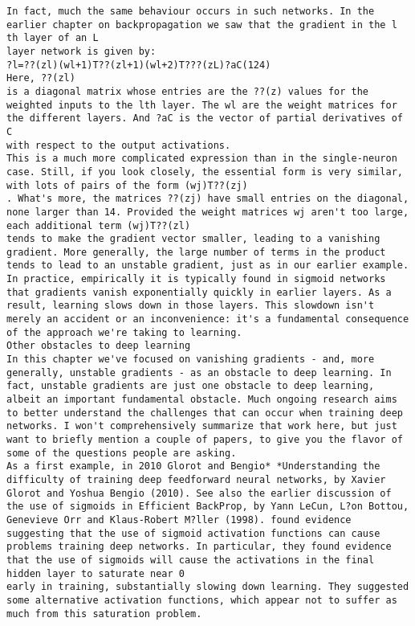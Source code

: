 \begin{lstlisting}
In fact, much the same behaviour occurs in such networks. In the earlier chapter on backpropagation we saw that the gradient in the l
th layer of an L
layer network is given by:
?l=??(zl)(wl+1)T??(zl+1)(wl+2)T???(zL)?aC(124)
Here, ??(zl)
is a diagonal matrix whose entries are the ??(z) values for the weighted inputs to the lth layer. The wl are the weight matrices for the different layers. And ?aC is the vector of partial derivatives of C
with respect to the output activations.
This is a much more complicated expression than in the single-neuron case. Still, if you look closely, the essential form is very similar, with lots of pairs of the form (wj)T??(zj)
. What's more, the matrices ??(zj) have small entries on the diagonal, none larger than 14. Provided the weight matrices wj aren't too large, each additional term (wj)T??(zl)
tends to make the gradient vector smaller, leading to a vanishing gradient. More generally, the large number of terms in the product tends to lead to an unstable gradient, just as in our earlier example. In practice, empirically it is typically found in sigmoid networks that gradients vanish exponentially quickly in earlier layers. As a result, learning slows down in those layers. This slowdown isn't merely an accident or an inconvenience: it's a fundamental consequence of the approach we're taking to learning.
Other obstacles to deep learning
In this chapter we've focused on vanishing gradients - and, more generally, unstable gradients - as an obstacle to deep learning. In fact, unstable gradients are just one obstacle to deep learning, albeit an important fundamental obstacle. Much ongoing research aims to better understand the challenges that can occur when training deep networks. I won't comprehensively summarize that work here, but just want to briefly mention a couple of papers, to give you the flavor of some of the questions people are asking.
As a first example, in 2010 Glorot and Bengio* *Understanding the difficulty of training deep feedforward neural networks, by Xavier Glorot and Yoshua Bengio (2010). See also the earlier discussion of the use of sigmoids in Efficient BackProp, by Yann LeCun, L?on Bottou, Genevieve Orr and Klaus-Robert M?ller (1998). found evidence suggesting that the use of sigmoid activation functions can cause problems training deep networks. In particular, they found evidence that the use of sigmoids will cause the activations in the final hidden layer to saturate near 0
early in training, substantially slowing down learning. They suggested some alternative activation functions, which appear not to suffer as much from this saturation problem.

\end{lstlisting}
